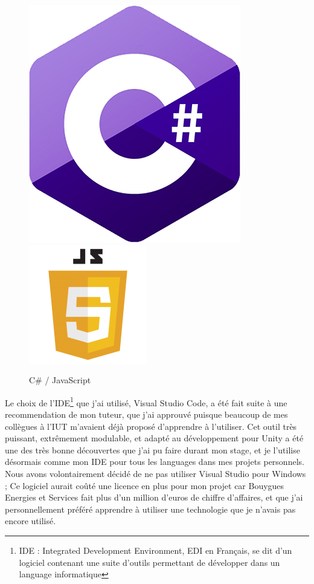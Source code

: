 \documentclass[a4paper]{article}
\begin{document}
    \begin{figure}[H]
        \centering
        \includegraphics[scale=0.3]{img/logo-csharp}
        \hspace{10pt}
        \includegraphics[scale=0.65]{img/logo-javascript}
        \caption{C\# / JavaScript}
    \end{figure}

    \vfill

    Le choix de l'IDE\footnote{IDE : Integrated Development Environment, EDI en Français, se dit d'un logiciel contenant une suite d'outils permettant de développer dans un language informatique} que j'ai utilisé, Visual Studio Code, a été fait suite à une recommendation de mon tuteur, que j'ai approuvé puisque beaucoup de mes collègues à l'IUT m'avaient déjà proposé d'apprendre à l'utiliser. Cet outil très puissant, extrêmement modulable, et adapté au développement pour Unity a été une des très bonne découvertes que j'ai pu faire durant mon stage, et je l'utilise désormais comme mon IDE pour tous les languages dans mes projets personnels. Nous avons volontairement décidé de ne pas utiliser Visual Studio pour Windows ; Ce logiciel aurait coûté une licence en plus pour mon projet car Bouygues Energies et Services fait plus d'un million d'euros de chiffre d'affaires, et que j'ai personnellement préféré apprendre à utiliser une technologie que je n'avais pas encore utilisé. \\
\end{document}

